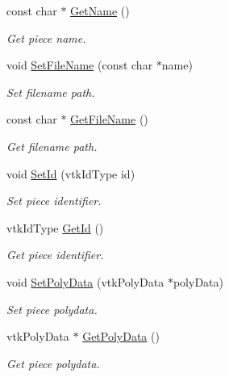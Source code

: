 \begin{DoxyCompactItemize}
const char $\ast$ \hyperlink{classvtkPiece_aaaf5a6463ed77fff3a6ece4612db0e13}{GetName} ()
\begin{DoxyCompactList}\small\item\em Get piece name. \item\end{DoxyCompactList}\item 
void \hyperlink{classvtkPiece_a6bd1ffdbd75747966f41c7dfee8f8b4d}{SetFileName} (const char $\ast$name)
\begin{DoxyCompactList}\small\item\em Set filename path. \item\end{DoxyCompactList}\item 
const char $\ast$ \hyperlink{classvtkPiece_a1a91d9507576694b80da93c1ce7c3861}{GetFileName} ()
\begin{DoxyCompactList}\small\item\em Get filename path. \item\end{DoxyCompactList}\item 
void \hyperlink{classvtkPiece_a077a58755fe796f485c25e3ecda1e994}{SetId} (vtkIdType id)
\begin{DoxyCompactList}\small\item\em Set piece identifier. \item\end{DoxyCompactList}\item 
vtkIdType \hyperlink{classvtkPiece_a2c1faf03ee84364ed939a330d58ab2a6}{GetId} ()
\begin{DoxyCompactList}\small\item\em Get piece identifier. \item\end{DoxyCompactList}\item 
void \hyperlink{classvtkPiece_a0efb6741a7e3251558b940a92bed9267}{SetPolyData} (vtkPolyData $\ast$polyData)
\begin{DoxyCompactList}\small\item\em Set piece polydata. \item\end{DoxyCompactList}\item 
vtkPolyData $\ast$ \hyperlink{classvtkPiece_a991a9f7eb675432b0a42da9094fbaed0}{GetPolyData} ()
\begin{DoxyCompactList}\small\item\em Get piece polydata. \item\end{DoxyCompactList}\item 

\end{DoxyCompactItemize}
